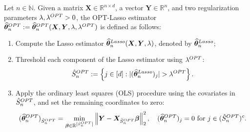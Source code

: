 \documentclass[10pt,a4paper]{amsart}
\newcommand{\bN}{\mathbb{N}}
\newcommand{\bX}{\boldsymbol{X}}
\newcommand{\bY}{\boldsymbol{Y}}
\newcommand{\bd}[1]{\boldsymbol{#1}}
\newcommand{\hbtheta}{\widehat{\boldsymbol{\theta}}}
\newcommand{\hdS}{\hat{S}^{\textup{OPT}}}
\newcommand{\hdlambda}{\lambda^{\textup{OPT}}}
\newcommand{\ltheta}{\hbtheta^{\textup{Lasso}}}
\newcommand{\mR}{\mathbb{R}}
\newcommand{\pS}{\hat{S}^{\textup{OPT}}}
\newcommand{\ptheta}{\widehat{\boldsymbol{\theta}}^{\textup{OPT}}}
\begin{document}
\begin{definition} \label{def: OPT-Lasso}
Let $n \in \bN$. Given  a matrix $\bX\in\mR^{n\times d}$, a vector $\bY\in\mR^n$, and two regularization parameters $\lambda, \hdlambda > 0$, the OPT-Lasso estimator $\ptheta_n := \ptheta_n(\bX, \bY, \lambda, \hdlambda)$ is defined as follows:
\begin{enumerate}
    \item Compute the Lasso estimator $\ltheta_n(\bX,\bY,\lambda)$, denoted by $\ltheta_n$; 
    \item Threshold each component of the Lasso estimator using $\hdlambda$: 
    \begin{align*}
        \pS_n := \left\{j \in [d]: |(\ltheta_n)_j| > \hdlambda \right\}.
    \end{align*}
    
    \item Apply the ordinary least squares (OLS) procedure using the covariates in $\hdS_n$, and set the remaining coordinates to zero:
    \begin{equation*}%
        (\ptheta_n)_{\hdS_n}=\min_{\bd{\beta}\in \mR^{\left|\hdS_n\right|}} \left\|\bY-\bX_{\hdS_n}\bd{\beta}\right\|_2^2, \quad (\ptheta_n)_j=0 \text{ for } j\in(\hdS_n)^c.
    \end{equation*}
\end{enumerate}
\end{definition}
\end{document}
